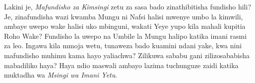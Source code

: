 Lakini je, \textit{Mafundisho za Kimsingi} zetu za sasa bado zinathibitisha fundisho hili? Je, zinafundisha wazi kwamba Mungu ni Nafsi halisi mwenye umbo la kimwili, ambaye uwepo wake halisi uko mbinguni, wakati Yeye yupo kila mahali kupitia Roho Wake? Fundisho la uwepo na Umbile la Mungu halipo katika imani rasmi za leo. Ingawa kila mmoja wetu, tunaweza bado kuamini ndani yake, kwa nini mafundisho muhimu kama hayo yaliachwa? Zilikuwa sababu gani zilizosababisha mabadiliko haya? Haya ndio maswali ambayo lazima tuchunguze zaidi katika muktadha wa \textit{Msingi wa Imani Yetu}.


